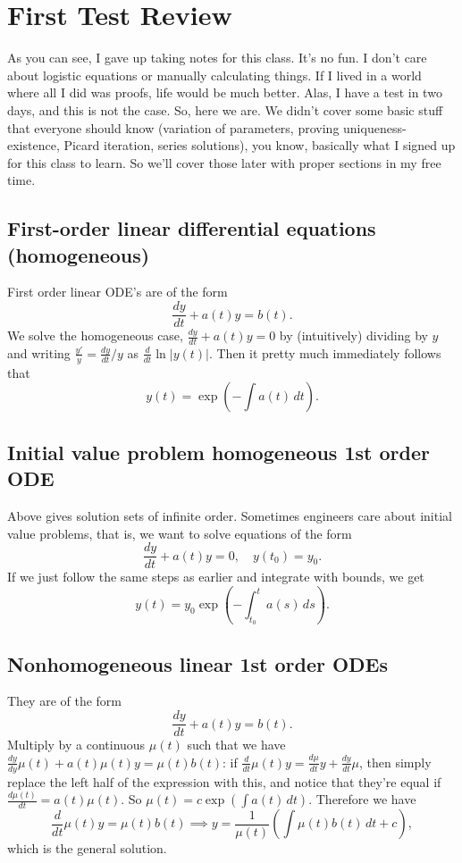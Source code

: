 \section{First Test Review}
As you can see, I gave up taking notes for this class. It's no fun. I don't care about logistic equations or manually calculating things. If I lived in a world where all I did was proofs, life would be much better. Alas, I have a test in two days, and this is not the case. So, here we are.
\orbreak
We didn't cover some basic stuff that everyone should know (variation of parameters, proving uniqueness-existence, Picard iteration, series solutions), you know, basically what I signed up for this class to learn. So we'll cover those later with proper sections in my free time.
\subsection{First-order linear differential equations (homogeneous)}
First order linear ODE's are of the form 
\begin{equation}
    \frac{dy}{dt}+a(t)y=b(t).
\end{equation}
We solve the homogeneous case, $\frac{dy}{dt}+a(t)y=0$ by (intuitively) dividing by $y$ and writing $\frac{y'}{y}=\frac{dy}{dt}/y$ as $\frac{d}{dt} \ln|y(t)|$. Then it pretty much immediately follows that \[
    y(t)=\exp \left( -\int a(t) \, dt \right) .
\] 
\subsection{Initial value problem homogeneous 1st order ODE}
Above gives solution sets of infinite order. Sometimes engineers care about initial value problems, that is, we want to solve equations of the form 
\begin{equation}
    \frac{dy}{dt}+a(t)y=0,\quad y(t_0)=y_0.
\end{equation}
If we just follow the same steps as earlier and integrate with bounds, we get 
\[
    y(t)=y_0\exp\left( -\int_{t_0}^{t} a(s) \, ds \right) .
\] 
\subsection{Nonhomogeneous linear 1st order ODEs}
They are of the form
\begin{equation}
    \frac{dy}{dt}+a(t)y=b(t).
\end{equation}
Multiply by a continuous $\mu(t)$ such that we have $\frac{dy}{dy}\mu(t)+a(t)\mu(t)y=\mu(t)b(t)$: if $\frac{d}{dt} \mu(t)y=\frac{d\mu}{dt}y+\frac{dy}{dt}\mu$, then simply replace the left half of the expression with this, and notice that they're equal if $ \frac{d\mu(t)}{dt}=a(t)\mu(t)$. So $\mu(t)=c\exp\left( \int a(t) \, dt \right) $. Therefore we have \[
    \frac{d}{dt} \mu(t)y=\mu(t)b(t) \implies y=\frac{1}{\mu(t)}\left( \int \mu(t)b(t) \, dt +c\right),
\] which is the general solution.
